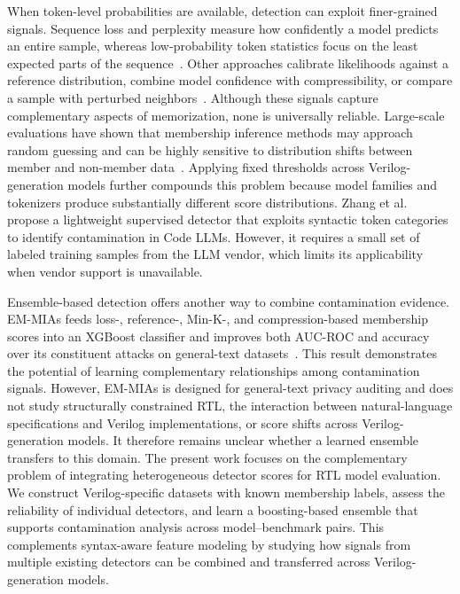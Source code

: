 When token-level probabilities are available, detection can exploit finer-grained signals. Sequence loss and perplexity measure how confidently a model predicts an entire sample, whereas low-probability token statistics focus on the least expected parts of the sequence~\cite{li2309estimating,shi2024detecting,zhang2025min}. Other approaches calibrate likelihoods against a reference distribution, combine model confidence with compressibility, or compare a sample with perturbed neighbors~\cite{zhang2024pretraining,carlini2021extracting,mattern2023membership}. Although these signals capture complementary aspects of memorization, none is universally reliable. Large-scale evaluations have shown that membership inference methods may approach random guessing and can be highly sensitive to distribution shifts between member and non-member data~\cite{duan2024membership}. Applying fixed thresholds across Verilog-generation models further compounds this problem because model families and tokenizers produce substantially different score distributions. Zhang et al.~\cite{zhang2026syntaxaware} propose a lightweight supervised detector that exploits syntactic token categories to identify contamination in Code LLMs. However, it requires a small set of labeled training samples from the LLM vendor, which limits its applicability when vendor support is unavailable.

Ensemble-based detection offers another way to combine contamination evidence. EM-MIAs feeds loss-, reference-, Min-K-, and compression-based membership scores into an XGBoost classifier and improves both AUC-ROC and accuracy over its constituent attacks on general-text datasets~\cite{song2025mias}. This result demonstrates the potential of learning complementary relationships among contamination signals. However, EM-MIAs is designed for general-text privacy auditing and does not study structurally constrained RTL, the interaction between natural-language specifications and Verilog implementations, or score shifts across Verilog-generation models. It therefore remains unclear whether a learned ensemble transfers to this domain. The present work focuses on the complementary problem of integrating heterogeneous detector scores for RTL model evaluation. We construct Verilog-specific datasets with known membership labels, assess the reliability of individual detectors, and learn a boosting-based ensemble that supports contamination analysis across model--benchmark pairs. This complements syntax-aware feature modeling by studying how signals from multiple existing detectors can be combined and transferred across Verilog-generation models.



